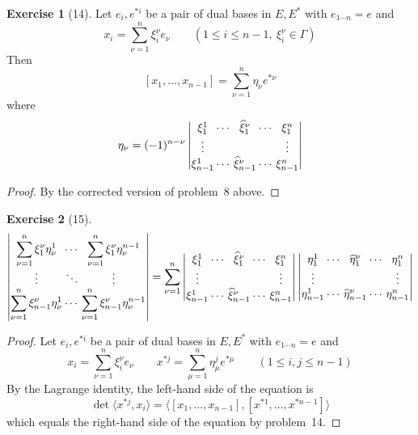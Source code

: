 \documentclass[letterpaper,12pt]{article}
\newcommand{\delete}{\widehat}
\newcommand{\sprod}[2]{\langle#1,#2\rangle}
\theoremstyle{definition}
\newtheorem*{exer}{Exercise}
\theoremstyle{remark}
\begin{document}
\begin{exer}[14]
Let \(e_i,e^{*i}\) be a pair of dual bases in \(E,E^*\) with \(e_{1\cdots n}=e\) and
\[x_i=\sum_{\nu=1}^n\xi_i^{\nu}e_{\nu}\qquad(1\le i\le n-1,\ \xi_i^{\nu}\in\Gamma)\]
Then
\[[x_1,\ldots,x_{n-1}]=\sum_{\nu=1}^n\eta_{\nu}e^{*\nu}\]
where
\[\setlength\arraycolsep{1pt}
\eta_{\nu}=(-1)^{n-\nu}\begin{vmatrix}
\xi_1^1&\cdots&\delete{\xi}_1^{\nu}&\cdots&\xi_1^n\\
\vdots&&&&\vdots\\
\xi_{n-1}^1&\cdots&\delete{\xi}_{n-1}^{\nu}&\cdots&\xi_{n-1}^n
\end{vmatrix}\]
\end{exer}
\begin{proof}
By the corrected version of problem~8 above.
\end{proof}

\begin{exer}[15]
\[\setlength\arraycolsep{1pt}
\begin{vmatrix}
\displaystyle\sum_{\nu=1}^n\xi_1^{\nu}\eta^1_{\nu}&\cdots&\displaystyle\sum_{\nu=1}^n\xi_1^{\nu}\eta^{n-1}_{\nu}\\
\vdots&\ddots&\vdots\\
\displaystyle\sum_{\nu=1}^n\xi_{n-1}^{\nu}\eta^1_{\nu}&\cdots&\displaystyle\sum_{\nu=1}^n\xi_{n-1}^{\nu}\eta^{n-1}_{\nu}
\end{vmatrix}=\sum_{\nu=1}^n\begin{vmatrix}
\xi_1^1&\cdots&\delete{\xi}_1^{\nu}&\cdots&\xi_1^n\\
\vdots&&&&\vdots\\
\xi_{n-1}^1&\cdots&\delete{\xi}_{n-1}^{\nu}&\cdots&\xi_{n-1}^n
\end{vmatrix}\begin{vmatrix}
\eta_1^1&\cdots&\delete{\eta}_1^{\nu}&\cdots&\eta_1^n\\
\vdots&&&&\vdots\\
\eta_{n-1}^1&\cdots&\delete{\eta}_{n-1}^{\nu}&\cdots&\eta_{n-1}^n
\end{vmatrix}
\]
\end{exer}
\begin{proof}
Let \(e_i,e^{*i}\) be a pair of dual bases in \(E,E^*\) with \(e_{1\cdots n}=e\) and
\[x_i=\sum_{\nu=1}^n\xi_i^{\nu}e_{\nu}\qquad x^{*j}=\sum_{\mu=1}^n\eta^j_{\mu}e^{*\mu}\qquad(1\le i,j\le n-1)\]
By the Lagrange identity, the left-hand side of the equation is
\[\det\sprod{x^{*j}}{x_i}=\sprod{[x_1,\ldots,x_{n-1}]}{[x^{*1},\ldots,x^{*n-1}]}\]
which equals the right-hand side of the equation by problem~14.
\end{proof}
\end{document}
